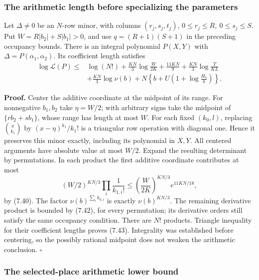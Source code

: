 \documentclass[
  11pt,
  a4paper,
]{article}
\begin{document}
\subsubsection{The arithmetic length before specializing the
parameters}\label{the-arithmetic-length-before-specializing-the-parameters}

Let \(\Delta\ne0\) be an \(N\)-row minor, with columns
\((r_j,s_j,t_j)\), \(0\le r_j\le R,\ 0\le s_j\le S\). Put
\(W=R|b_2|+S|b_1|>0\), and use \(q=(R+1)(S+1)\) in the preceding
occupancy bounds. There is an integral polynomial \(P(X,Y)\) with
\(\Delta=P(\alpha_1,\alpha_2)\). Its coefficient length satisfies \[
\begin{aligned}
\log\mathcal L(P)\le{}&\log(N!)+\frac{KN}{3}\log\frac{W}{2K}
+\frac{11KN}{9}+\frac{KN}{3}\log\frac{T}{KL}\\
&+\frac{KN}{3}\log\nu(b)
+N\left\{b+U\left(1+\log\frac{H_b}{b}\right)\right\}.
\end{aligned} \tag{7.43}
\]

\textbf{Proof.} Center the additive coordinate at the midpoint of its
range. For nonnegative \(b_1,b_2\) take \(\eta=W/2\); with arbitrary
signs take the midpoint of \(\{rb_2+sb_1\}\), whose range has length at
most \(W\). For each fixed \((k_0,l)\), replacing \(\binom{x}{k_1}\) by
\((x-\eta)^{k_1}/k_1!\) is a triangular row operation with diagonal one.
Hence it preserves this minor exactly, including its polynomial in
\(X,Y\). All centered arguments have absolute value at most \(W/2\).
Expand the resulting determinant by permutations. In each product the
first additive coordinate contributes at most \[
(W/2)^{KN/3}\prod_i\frac1{k_{1,i}!}
\le\left(\frac W{2K}\right)^{KN/3}e^{11KN/18},
\] by (7.40). The factor \(\nu(b)^{\sum_i k_{0,i}}\) is exactly
\(\nu(b)^{KN/3}\). The remaining derivative product is bounded by
(7.42), for every permutation; its derivative orders still satisfy the
same occupancy condition. There are \(N!\) products. Triangle inequality
for their coefficient lengths proves (7.43). Integrality was established
before centering, so the possibly rational midpoint does not weaken the
arithmetic conclusion. \(\square\)

\subsubsection{The selected-place arithmetic lower
bound}\label{the-selected-place-arithmetic-lower-bound}
\end{document}

